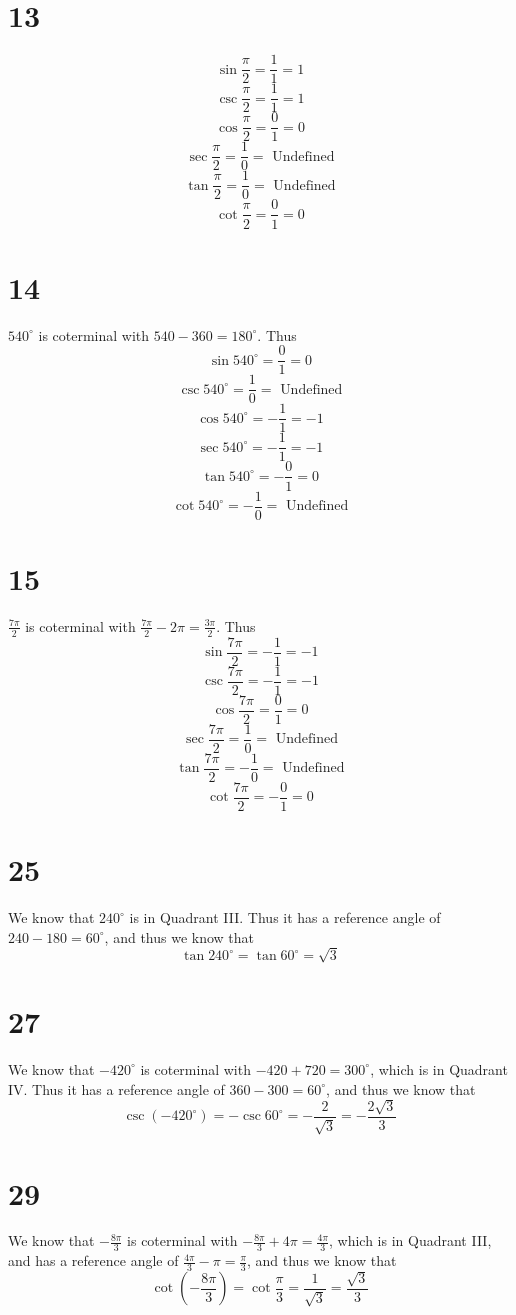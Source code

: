 \documentclass{article}
\theoremstyle{definition}
\newcommand{\?}{\stackrel{?}{=}}
\begin{document}
\section*{13}
\[ \sin\frac{\pi}{2}=\frac{1}{1}=1 \]
\[ \csc\frac{\pi}{2}=\frac{1}{1}=1 \]
\[ \cos\frac{\pi}{2}=\frac{0}{1}=0 \]
\[ \sec\frac{\pi}{2}=\frac{1}{0}=\textrm{ Undefined} \]
\[ \tan\frac{\pi}{2}=\frac{1}{0}=\textrm{ Undefined} \]
\[ \cot\frac{\pi}{2}=\frac{0}{1}=0 \]

\section*{14}
$540^\circ$ is coterminal with $540-360=180^\circ$. Thus
\[ \sin 540^\circ =\frac{0}{1}=0 \]
\[ \csc 540^\circ =\frac{1}{0}=\textrm{ Undefined} \]
\[ \cos 540^\circ =-\frac{1}{1}=-1 \]
\[ \sec 540^\circ =-\frac{1}{1}=-1 \]
\[ \tan 540^\circ =-\frac{0}{1}=0 \]
\[ \cot 540^\circ =-\frac{1}{0}=\textrm{ Undefined} \]

\section*{15}
$\frac{7\pi}{2}$ is coterminal with $\frac{7\pi}{2}-2\pi=\frac{3\pi}{2}$. Thus
\[ \sin\frac{7\pi}{2}=-\frac{1}{1}=-1 \]
\[ \csc\frac{7\pi}{2}=-\frac{1}{1}=-1 \]
\[ \cos\frac{7\pi}{2}=\frac{0}{1}=0 \]
\[ \sec\frac{7\pi}{2}=\frac{1}{0}=\textrm{ Undefined} \]
\[ \tan\frac{7\pi}{2}=-\frac{1}{0}=\textrm{ Undefined} \]
\[ \cot\frac{7\pi}{2}=-\frac{0}{1}=0 \]

\section*{25}
We know that $240^\circ$ is in Quadrant III. Thus it has a reference angle of $240-180=60^\circ$, and thus we know that
\[ \tan 240^\circ=\tan 60^\circ =\sqrt{3} \]

\section*{27}
We know that $-420^\circ$ is coterminal with $-420+720=300^\circ$, which is in Quadrant IV. Thus it has a reference angle of 
$360-300=60^\circ$, and thus we know that
\[ \csc\left(-420^\circ\right)=-\csc 60^\circ=-\frac{2}{\sqrt{3}}=-\frac{2\sqrt{3}}{3} \]

\section*{29}
We know that $-\frac{8\pi}{3}$ is coterminal with $-\frac{8\pi}{3}+4\pi=\frac{4\pi}{3}$, which is in Quadrant III, and has a reference angle of 
$\frac{4\pi}{3}-\pi=\frac{\pi}{3}$, and thus we know that
\[ \cot\left(-\frac{8\pi}{3}\right)=\cot\frac{\pi}{3}=\frac{1}{\sqrt{3}}=\frac{\sqrt{3}}{3} \]
\end{document}
